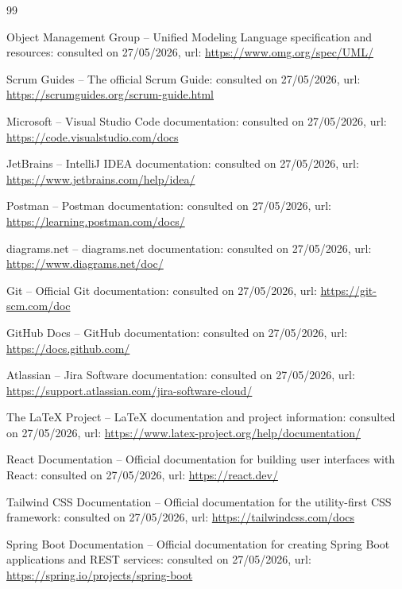 \begin{thebibliography}{99}

Object Management Group -- Unified Modeling Language specification and resources: consulted on 27/05/2026, url:
\url{https://www.omg.org/spec/UML/}

Scrum Guides -- The official Scrum Guide: consulted on 27/05/2026, url:
\url{https://scrumguides.org/scrum-guide.html}

Microsoft -- Visual Studio Code documentation: consulted on 27/05/2026, url:
\url{https://code.visualstudio.com/docs}

JetBrains -- IntelliJ IDEA documentation: consulted on 27/05/2026, url:
\url{https://www.jetbrains.com/help/idea/}

Postman -- Postman documentation: consulted on 27/05/2026, url:
\url{https://learning.postman.com/docs/}

diagrams.net -- diagrams.net documentation: consulted on 27/05/2026, url:
\url{https://www.diagrams.net/doc/}

Git -- Official Git documentation: consulted on 27/05/2026, url:
\url{https://git-scm.com/doc}

GitHub Docs -- GitHub documentation: consulted on 27/05/2026, url:
\url{https://docs.github.com/}

Atlassian -- Jira Software documentation: consulted on 27/05/2026, url:
\url{https://support.atlassian.com/jira-software-cloud/}

The LaTeX Project -- LaTeX documentation and project information: consulted on 27/05/2026, url:
\url{https://www.latex-project.org/help/documentation/}

React Documentation -- Official documentation for building user interfaces with React: consulted on 27/05/2026, url:
\url{https://react.dev/}

Tailwind CSS Documentation -- Official documentation for the utility-first CSS framework: consulted on 27/05/2026, url:
\url{https://tailwindcss.com/docs}

Spring Boot Documentation -- Official documentation for creating Spring Boot applications and REST services: consulted on 27/05/2026, url:
\url{https://spring.io/projects/spring-boot}


\end{thebibliography}
